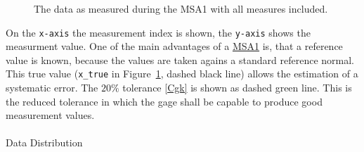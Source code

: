 \documentclass[
  a4paper,
]{scrbook}
\makeatletter
\let\oldparagraph\paragraph
\renewcommand{\paragraph}{
    \@ifstar
      \xxxParagraphStar
      \xxxParagraphNoStar
  }
\newcommand{\xxxParagraphStar}[1]{\oldparagraph*{#1}\mbox{}}
\newcommand{\xxxParagraphNoStar}[1]{\oldparagraph{#1}\mbox{}}
\makeatother
\begin{document}
\begin{figure}[ht]


\caption{\label{fig-msa1-plt}The data as measured during the MSA1 with
all measures included.}

\end{figure}%

On the \texttt{x-axis} the measurement index is shown, the
\texttt{y-axis} shows the measurment value. One of the main advantages
of a \hyperref[MSA1]{MSA1} is, that a reference value is known, because
the values are taken agains a standard reference normal. This true value
(\texttt{x\_true} in Figure~\ref{fig-msa1-plt}, dashed black line)
allows the estimation of a systematic error. The \(20\%\) tolerance
\eqref{Cgk} is shown as dashed green line. This is the reduced tolerance
in which the gage shall be capable to produce good measurement values.

\paragraph{Data Distribution}\label{data-distribution}
\end{document}
